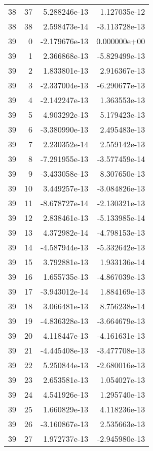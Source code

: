 \begin{tabular}{rrrr}
  38 &   37 &  5.288246e-13 &  1.127035e-12 \\
  38 &   38 &  2.598473e-14 & -3.113728e-13 \\
  39 &    0 & -2.179676e-13 &  0.000000e+00 \\
  39 &    1 &  2.366868e-13 & -5.829499e-13 \\
  39 &    2 &  1.833801e-13 &  2.916367e-13 \\
  39 &    3 & -2.337004e-13 & -6.290677e-13 \\
  39 &    4 & -2.142247e-13 &  1.363553e-13 \\
  39 &    5 &  4.903292e-13 &  5.179423e-13 \\
  39 &    6 & -3.380990e-13 &  2.495483e-13 \\
  39 &    7 &  2.230352e-14 &  2.559142e-13 \\
  39 &    8 & -7.291955e-13 & -3.577459e-14 \\
  39 &    9 & -3.433058e-13 &  8.307650e-13 \\
  39 &   10 &  3.449257e-13 & -3.084826e-13 \\
  39 &   11 & -8.678727e-14 & -2.130321e-13 \\
  39 &   12 &  2.838461e-13 & -5.133985e-14 \\
  39 &   13 &  4.372982e-14 & -4.798153e-13 \\
  39 &   14 & -4.587944e-13 & -5.332642e-13 \\
  39 &   15 &  3.792881e-13 &  1.933136e-14 \\
  39 &   16 &  1.655735e-13 & -4.867039e-13 \\
  39 &   17 & -3.943012e-14 &  1.884169e-13 \\
  39 &   18 &  3.066481e-13 &  8.756238e-14 \\
  39 &   19 & -4.836328e-13 & -3.664679e-13 \\
  39 &   20 &  4.118447e-13 & -4.161631e-13 \\
  39 &   21 & -4.445408e-13 & -3.477708e-13 \\
  39 &   22 &  5.250844e-13 & -2.680016e-13 \\
  39 &   23 &  2.653581e-13 &  1.054027e-13 \\
  39 &   24 &  4.541926e-13 &  1.295740e-13 \\
  39 &   25 &  1.660829e-13 &  4.118236e-13 \\
  39 &   26 & -3.160867e-13 &  2.535663e-13 \\
  39 &   27 &  1.972737e-13 & -2.945980e-13 \\

\end{tabular}
